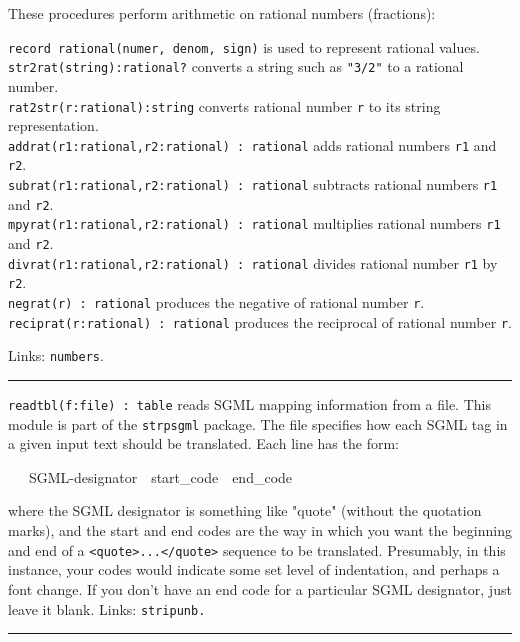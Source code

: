 These procedures perform arithmetic on rational
numbers (fractions):

\texttt{record rational(numer, denom, sign)} is used to represent
rational values.\\
\texttt{str2rat(string):rational?} converts a string such as
\texttt{"3/2"} to a rational
number.\\
\texttt{rat2str(r:rational):string} converts rational number \texttt{r}
to its string representation.\\
\texttt{addrat(r1:rational,r2:rational) : rational} adds rational
numbers \texttt{r1} and \texttt{r2}.\\
\texttt{subrat(r1:rational,r2:rational) : rational} subtracts rational
numbers \texttt{r1} and \texttt{r2}.\\
\texttt{mpyrat(r1:rational,r2:rational) : rational} multiplies rational
numbers \texttt{r1} and \texttt{r2}.\\
\texttt{divrat(r1:rational,r2:rational) : rational} divides rational
number \texttt{r1} by \texttt{r2}.\\
\texttt{negrat(r) : rational} produces the negative of rational number
\texttt{r}.\\
\texttt{reciprat(r:rational) : rational} produces the reciprocal of
rational number \texttt{r}.

Links: \texttt{numbers}. 

\vspace{0.25cm}\hrule{}

\texttt{readtbl(f:file) : table} reads SGML mapping
information from a file. This module is part of the \texttt{strpsgml}
package. The file specifies how each SGML tag in a given input text
should be translated. Each line has the form:

\ \ \ SGML-designator\ \ start\_code\ \ end\_code

where the SGML designator is something like
"quote" (without the quotation marks), and
the start and end codes are the way in which you want the beginning and
end of a
\texttt{{\textless}quote{\textgreater}...{\textless}/quote{\textgreater}}
sequence to be translated. Presumably, in this instance, your codes
would indicate some set level of indentation, and perhaps a font
change. If you don't have an end code for a particular
SGML designator, just leave it blank.
Links: \texttt{stripunb.}

\vspace{0.25cm}\hrule{}

